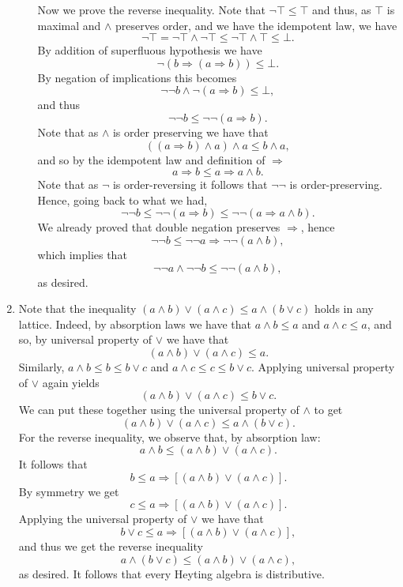 \documentclass{article}
\theoremstyle{plain}
\begin{document}
\begin{enumerate}
\begin{enumerate}
			Now we prove the reverse inequality. Note that $\neg \top \leq \top$ and thus, as $\top$ is maximal and $\wedge$ preserves order, and we have the idempotent law, we have
			\[
				\neg \top = \neg \top \wedge \neg \top \leq  \neg \top \wedge \top \leq \bot.
			\]
			By addition of superfluous hypothesis we have
			\[
				\neg(b \Rightarrow (a \Rightarrow b)) \leq \bot.
			\]
			By negation of implications this becomes
			\[
				\neg\neg b  \wedge \neg (a \Rightarrow b) \leq \bot,
			\]
			and thus
			\[
				\neg\neg b \leq \neg\neg (a\Rightarrow b).
			\]
			Note that as $\wedge$ is order preserving we have that
			\[
				((a \Rightarrow b) \wedge a) \wedge a \leq b \wedge a,
			\]
			and so by the idempotent law and definition of $\Rightarrow$
			\[
				a\Rightarrow b \leq a \Rightarrow a\wedge b.
 			\]
 			Note that as $\neg$ is order-reversing it follows that $\neg\neg$ is order-preserving. Hence, going back to what we had,
 			\[
 				\neg\neg b \leq \neg\neg (a\Rightarrow b) \leq \neg\neg (a \Rightarrow a\wedge b).
 			\]
 			We already proved that double negation preserves $\Rightarrow$, hence
 			\[
 				\neg\neg b \leq \neg\neg a \Rightarrow \neg\neg(a\wedge b),
 			\]
 			which implies that 
 			\[
 				\neg\neg a \wedge \neg\neg b \leq \neg\neg (a\wedge b),
 			\]
 			as desired.
		\end{enumerate}
		\item Note that the inequality $(a\wedge b)\vee (a\wedge c) \leq a\wedge (b\vee c)$ holds in any lattice. Indeed, by absorption laws we have that $a\wedge b \leq a$ and $a\wedge c \leq a$, and so, by universal property of $\vee$ we have that
		\[
			(a\wedge b)\vee (a\wedge c) \leq a.
		\]
		Similarly, $a\wedge b \leq b \leq b\vee c$ and $a\wedge c \leq c\leq b\vee c$. Applying universal property of $\vee$ again yields
		\[
			(a\wedge b)\vee (a\wedge c) \leq b \vee c.
		\]
		We can put these together using the universal property of $\wedge$ to get 
		\[
			(a\wedge b)\vee (a\wedge c) \leq a\wedge (b\vee c).
		\]
		For the reverse inequality, we observe that, by absorption law:
		\[
			a \wedge b \leq (a\wedge b) \vee (a\wedge c).
		\]
		It follows that 
		\[
			b \leq a \Rightarrow [(a\wedge b) \vee (a\wedge c)].
		\]
		By symmetry we get
		\[
			c \leq a \Rightarrow [(a\wedge b) \vee (a\wedge c)].
		\]
		Applying the universal property of $\vee$ we have that
		\[
			b\vee c \leq a \Rightarrow [(a\wedge b) \vee (a\wedge c)],
		\]
		and thus we get the reverse inequality
		\[
			a\wedge (b\vee c)\leq (a\wedge b) \vee (a\wedge c),
		\]
		as desired. It follows that every Heyting algebra is distributive.
		

\end{enumerate}
\end{document}
